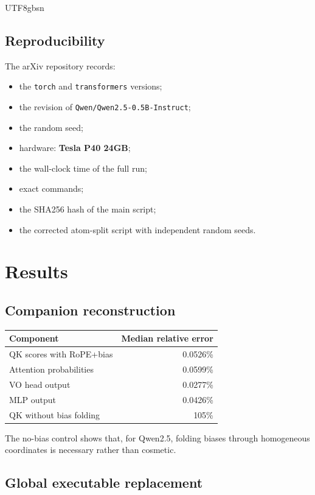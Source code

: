 \documentclass[11pt]{article}
\providecommand{\tightlist}{\setlength{\itemsep}{0pt}\setlength{\parskip}{0pt}}
\begin{document}
\begin{CJK*}{UTF8}{gbsn}
\subsection{Reproducibility}

The arXiv repository records:

\begin{itemize}
\tightlist
\item
  the \texttt{torch} and \texttt{transformers} versions;
\item
  the revision of \texttt{Qwen/Qwen2.5-0.5B-Instruct};
\item
  the random seed;
\item
  hardware: \textbf{Tesla P40 24GB};
\item
  the wall-clock time of the full run;
\item
  exact commands;
\item
  the SHA256 hash of the main script;
\item
  the corrected atom-split script with independent random seeds.
\end{itemize}

\section{Results}

\subsection{Companion
reconstruction}

\begin{center}
\small
\begin{tabular}{@{}lr@{}}
\toprule
Component & Median relative error \\
\midrule
QK scores with RoPE+bias & 0.0526\% \\
Attention probabilities & 0.0599\% \\
VO head output & 0.0277\% \\
MLP output & 0.0426\% \\
QK without bias folding & 105\% \\
\bottomrule
\end{tabular}
\end{center}

The no-bias control shows that, for Qwen2.5, folding biases through
homogeneous coordinates is necessary rather than cosmetic.

\subsection{Global executable
replacement}


\end{CJK*}
\end{document}
